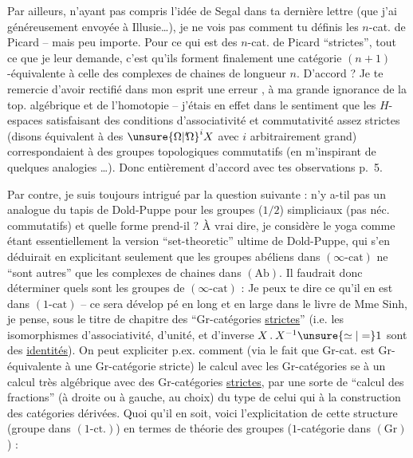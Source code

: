 Par ailleurs, n'ayant pas compris l'idée de Segal dans ta dernière lettre (que j'ai généreusement envoyée à Illusie\dots), je ne vois pas comment tu définis les $n$-cat. de Picard -- mais peu importe. Pour ce qui est des $n$-cat. de Picard ``strictes'', tout ce que je leur demande, c'est qu'ils forment finalement une catégorie $(n+1)$-équivalente à celle des complexes de chaines de longueur $n$. D'accord ? Je te remercie
d'avoir rectifié dans mon esprit une erreur ,  à ma grande ignorance de la top. algébrique et de l'homotopie -- j'étais en effet dans le sentiment que les $H$-espaces satisfaisant des conditions d'associativité et commutativité assez strictes (disons équivalent à des ${\unsure{\Omega|{}'\!\Omega}}^{i}X$ avec $i$ arbitrairement grand) correspondaient à des groupes topologiques commutatifs (en m'inspirant de quelques analogies \dots). Donc entièrement d'accord avec tes observations p.~5.

Par contre, je suis toujours intrigué par la question suivante : n'y a-til pas un analogue du tapis de Dold-Puppe pour les groupes ($1/2$) simpliciaux (pas néc. commutatifs) et quelle forme prend-il ? À vrai dire, je considère le yoga
comme étant essentiellement la version ``set-theoretic'' ultime de Dold-Puppe, qui s'en déduirait en explicitant seulement que les groupes abéliens dans $(\infty\text{-cat})$ ne ``sont autres'' que les complexes de chaines dans $(\mathrm{Ab})$. Il faudrait donc déterminer quels sont les groupes de $(\infty\text{-cat})$ : Je peux te dire ce qu'il en est dans $(1\text{-cat})$ -- ce sera dévelop%
%
pé en long et en large dans le livre de Mme Sinh, je pense, sous le titre de chapitre des ``Gr-catégories \uline{strictes}'' (i.e.  les isomorphismes d'associativité, d'unité, et d'inverse $X\mathbin{.}X^{-1}\unsure{\simeq|=}1$ sont des \uline{identités}). On peut expliciter p.ex. comment (via le fait que  Gr-cat. est Gr-équivalente à une Gr-catégorie stricte) le calcul avec les Gr-catégories se  à un calcul très algébrique avec des Gr-catégories \uline{strictes}, par une sorte de ``calcul des fractions'' (à droite ou à gauche, au choix) du type de celui qui  à la construction des catégories dérivées. Quoi qu'il en soit, voici l'explicitation de cette structure (groupe dans $(1\text{-ct.})$) en termes de théorie des groupes ($1$-catégorie dans $(\mathrm{Gr})$) :

